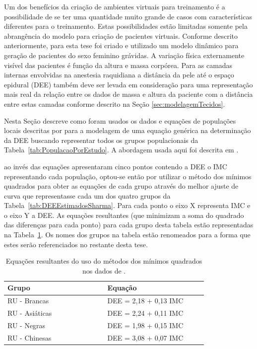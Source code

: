 Um dos benefícios da criação de ambientes virtuais para treinamento é a possibilidade de se ter uma quantidade muito grande de casos com características diferentes para o treinamento. Estas possibilidades estão limitadas somente pela abrangência do modelo para criação de pacientes virtuais. Conforme descrito anteriormente, para esta tese foi criado e utilizado um modelo dinâmico para geração de pacientes do sexo feminino grávidas. A variação física externamente visível das pacientes é função da altura e massa corpórea. Para as camadas internas envolvidas na anestesia raquidiana a distância da pele até o espaço epidural (\acrshort{DEE}) também deve ser levada em consideração para uma representação mais real da relação entre os dados de massa e altura da paciente com a distância entre estas camadas conforme descrito na Seção \ref{sec:modelagemTecidos}. 

Nesta Seção descreve como foram usados os dados e equações de populações locais descritas por \textcite{Clinkscales2007, Sharma2011, Hazarika2016} para a modelagem de uma equação genérica na determinação da \acrshort{DEE} buscando representar todos os grupos populacionais da Tabela~\ref{tab:PopulacaoPorEstudo}.
A abordagem usada aqui foi descrita em \textcite{Melo2020}.

\textcite{Sharma2011} ao invés das equações apresentaram cinco pontos contendo a \acrshort{DEE} o \acrshort{IMC} representando cada população, optou-se então por utilizar o método dos mínimos quadrados para obter as equações de cada grupo através do melhor ajuste de curva que representasse cada um dos quatro grupos da Tabela~\ref{tab:DEEEstimadosSharma}. Para cada ponto o eixo X representa \acrshort{IMC} e o eixo Y a \acrshort{DEE}. As equações resultantes (que minimizam a soma do quadrado das diferenças para cada ponto) para cada grupo desta tabela estão representadas na Tabela~\ref{tab:DEEEquacoesMinimosQuadrados}. Os nomes dos grupos na tabela estão renomeados para a forma que estes serão referenciados no restante desta tese.

\begin{table}[!ht]
\begin{center}
\caption{Equações resultantes do uso do métodos dos mínimos quadrados nos dados de \textcite{Sharma2011}.}
\label{tab:DEEEquacoesMinimosQuadrados}
\begin{tabular}{|p{0.4\linewidth}|p{0.4\linewidth}|}
\hline
\textbf{Grupo} & \textbf{Equação}\\
\hline\hline
RU - Brancas & DEE = 2,18 + 0,13 IMC\\
RU - Asiáticas & DEE = 2,24 + 0,11 IMC\\
RU - Negras & DEE = 1,98 + 0,15 IMC\\
RU - Chinesas & DEE = 3,08 + 0,07 IMC\\
\hline
\end{tabular}
\end{center}
\end{table}

